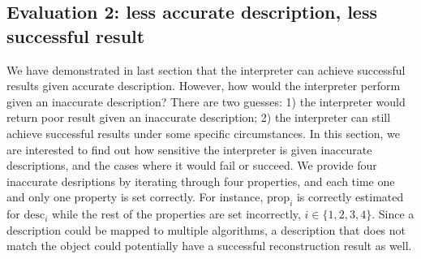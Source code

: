\subsection{Evaluation 2: less accurate description, less successful result}
We have demonstrated in last section that the interpreter can achieve successful results given accurate description. However, how would the interpreter perform given an inaccurate description? There are two guesses: 1) the interpreter would return poor result given an inaccurate description; 2) the interpreter can still achieve successful results under some specific circumstances. In this section, we are interested to find out how sensitive the interpreter is given inaccurate descriptions, and the cases where it would fail or succeed. We provide four inaccurate desriptions by iterating through four properties, and each time one and only one property is set correctly. For instance, $\text{prop}_i$ is correctly estimated for $\text{desc}_i$ while the rest of the properties are set incorrectly, $i\in \{1, 2, 3, 4\}$. Since a description could be mapped to multiple algorithms, a description that does not match the object could potentially have a successful reconstruction result as well.

